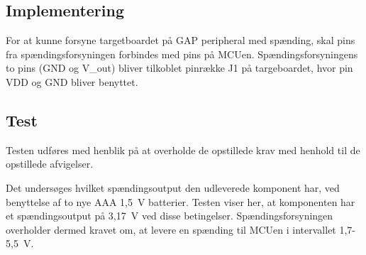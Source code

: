 \subsection{Implementering}
For at kunne forsyne targetboardet på GAP peripheral med spænding, skal pins fra spændingsforsyningen forbindes med pins på MCUen. 
Spændingsforsyningens to pins (GND og V_out) bliver tilkoblet pinrække J1 på targeboardet, hvor pin VDD og GND bliver benyttet.

\subsection{Test} 
Testen udføres med henblik på at overholde de opstillede krav med henhold til de opstillede afvigelser. 

Det undersøges hvilket spændingsoutput den udleverede komponent har, ved benyttelse af to nye AAA 1,5~V batterier. Testen viser her, at komponenten har et spændingsoutput på 3,17~V ved disse betingelser.\newline
Spændingsforsyningen overholder dermed kravet om, at levere en spænding til MCUen i intervallet 1,7-5,5~V. 




